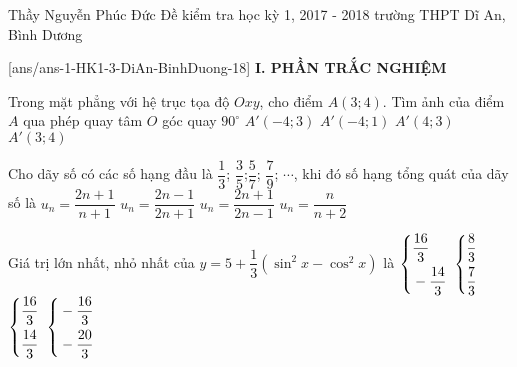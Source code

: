 	\begin{name}
		{Thầy Nguyễn Phúc Đức}
		{Đề kiểm tra học kỳ 1, 2017 - 2018 trường THPT Dĩ An, Bình Dương}
	\end{name}
	\setcounter{ex}{0}\setcounter{bt}{0}
	[ans/ans-1-HK1-3-DiAn-BinhDuong-18]
\noindent\textbf{I. PHẦN TRẮC NGHIỆM}
\begin{ex}%
	Trong mặt phẳng với hệ trục tọa độ $Oxy$, cho điểm $A(3;4)$. Tìm ảnh của điểm $A$ qua phép quay tâm $O$ góc quay $90^\circ$
		\choice
	{\True $A'(-4;3)$}
	{$A'(-4;1)$}
	{$A'(4;3)$}
	{$A'(3;4)$}
\end{ex}
\begin{ex}%
	Cho dãy số có các số hạng đầu là $\dfrac{1}{3}$; $\dfrac{3}{5}$;$\dfrac{5}{7}$; $\dfrac{7}{9}$; $\cdots$, khi đó số hạng tổng quát của dãy số là 
	\choice
	{$u_n=\dfrac{2n+1}{n+1}$}
	{\True $u_n=\dfrac{2n-1}{2n+1}$}
    {$u_n=\dfrac{2n+1}{2n-1}$}
	{$u_n=\dfrac{n}{n+2}$}
\end{ex}
\begin{ex}%
	Giá trị lớn nhất, nhỏ nhất của $y=5+\dfrac{1}{3}\left(\sin^2 x-\cos^2 x\right)$ là  
	\choice
	{$\left\{\begin{aligned}&\dfrac{16}{3}\\&-\dfrac{14}{3}\end{aligned}\right.$}
	{$\left\{\begin{aligned}&\dfrac{8}{3}\\&\dfrac{7}{3}\end{aligned}\right.$}
	{\True $\left\{\begin{aligned}&\dfrac{16}{3}\\&\dfrac{14}{3}\end{aligned}\right.$}
	{$\left\{\begin{aligned}&-\dfrac{16}{3}\\&-\dfrac{20}{3}\end{aligned}\right.$}
\end{ex}
